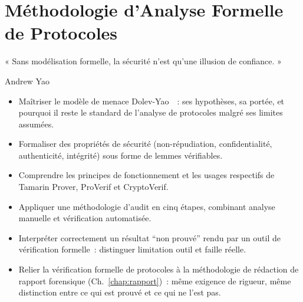 
\chapter{Méthodologie d'Analyse Formelle de Protocoles}
\label{chap:form-meth}

\epigraph{%
    « Sans modélisation formelle, la sécurité n'est qu'une illusion de
    confiance. »%
}{Andrew Yao}


\begin{boxobjectifs}
\begin{itemize}
    \item Maîtriser le modèle de menace Dolev-Yao~\cite{dolevyao1983}~: ses hypothèses,
          sa portée, et pourquoi il reste le standard de l'analyse
          de protocoles malgré ses limites assumées.
    \item Formaliser des propriétés de sécurité (non-répudiation,
          confidentialité, authenticité, intégrité) sous forme de
          lemmes vérifiables.
    \item Comprendre les principes de fonctionnement et les usages
          respectifs de Tamarin Prover, ProVerif et CryptoVerif.
    \item Appliquer une méthodologie d'audit en cinq étapes,
          combinant analyse manuelle et vérification automatisée.
    \item Interpréter correctement un résultat ``non prouvé'' rendu
          par un outil de vérification formelle~: distinguer
          limitation outil et faille réelle.
    \item Relier la vérification formelle de protocoles à la
          méthodologie de rédaction de rapport forensique
          (Ch.~\ref{chap:rapport})~: même exigence de rigueur,
          même distinction entre ce qui est prouvé et ce qui ne
          l'est pas.
\end{itemize}
\end{boxobjectifs}

